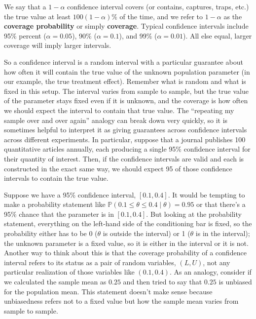 \documentclass[
  13pt,
  letterpaper,
  DIV=11,
  numbers=noendperiod]{scrreprt}
\renewcommand{\P}{\mathbb{P}}
\theoremstyle{definition}
\theoremstyle{definition}
\theoremstyle{plain}
\theoremstyle{remark}
\begin{document}
We say that a \(1-\alpha\) confidence interval covers (or contains,
captures, traps, etc.) the true value at least \(100(1-\alpha)\%\) of
the time, and we refer to \(1-\alpha\) as the \textbf{coverage
probability} or simply \textbf{coverage}. Typical confidence intervals
include 95\% percent (\(\alpha = 0.05\)), 90\% (\(\alpha = 0.1\)), and
99\% (\(\alpha = 0.01\)). All else equal, larger coverage will imply
larger intervals.

So a confidence interval is a random interval with a particular
guarantee about how often it will contain the true value of the unknown
population parameter (in our example, the true treatment effect).
Remember what is random and what is fixed in this setup. The interval
varies from sample to sample, but the true value of the parameter stays
fixed even if it is unknown, and the coverage is how often we should
expect the interval to contain that true value. The ``repeating my
sample over and over again'' analogy can break down very quickly, so it
is sometimes helpful to interpret it as giving guarantees across
confidence intervals across different experiments. In particular,
suppose that a journal publishes 100 quantitative articles annually,
each producing a single 95\% confidence interval for their quantity of
interest. Then, if the confidence intervals are valid and each is
constructed in the exact same way, we should expect 95 of those
confidence intervals to contain the true value.

\begin{tcolorbox}[enhanced jigsaw, leftrule=.75mm, colbacktitle=quarto-callout-warning-color!10!white, title=\textcolor{quarto-callout-warning-color}{\faExclamationTriangle}\hspace{0.5em}{Warning}, toptitle=1mm, breakable, left=2mm, toprule=.15mm, arc=.35mm, opacitybacktitle=0.6, opacityback=0, colback=white, rightrule=.15mm, titlerule=0mm, colframe=quarto-callout-warning-color-frame, bottomtitle=1mm, bottomrule=.15mm, coltitle=black]

Suppose we have a 95\% confidence interval, \([0.1, 0.4]\). It would be
tempting to make a probability statement like
\(\P(0.1 \leq \theta \leq 0.4 \mid \theta) = 0.95\) or that there's a
95\% chance that the parameter is in \([0.1, 0.4]\). But looking at the
probability statement, everything on the left-hand side of the
conditioning bar is fixed, so the probability either has to be 0
(\(\theta\) is outside the interval) or 1 (\(\theta\) is in the
interval); the unknown parameter is a fixed value, so it is either in
the interval or it is not. Another way to think about this is that the
coverage probability of a confidence interval refers to its status as a
pair of random variables, \((L, U)\), not any particular realization of
those variables like \((0.1, 0.4)\). As an analogy, consider if we
calculated the sample mean as \(0.25\) and then tried to say that
\(0.25\) is unbiased for the population mean. This statement doesn't
make sense because unbiasedness refers not to a fixed value but how the
sample mean varies from sample to sample.

\end{tcolorbox}
\end{document}
